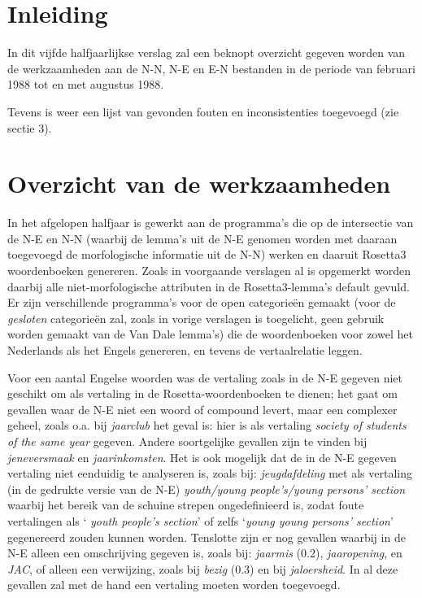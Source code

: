 

   \RosSupersedes{-}
   \MakeRosTitle
%
%

\section{Inleiding}

In dit vijfde halfjaarlijkse verslag zal een beknopt 
overzicht gegeven worden van de 
werkzaamheden aan de N-N, N-E en E-N bestanden in de periode van februari 1988
tot en met augustus 1988.

Tevens is weer een lijst van gevonden fouten en inconsistenties toegevoegd
(zie sectie 3).

\section{Overzicht van de werkzaamheden}

In het afgelopen halfjaar is gewerkt aan de programma's die op
de intersectie van de N-E en N-N (waarbij de lemma's uit de N-E genomen
worden met daaraan toegevoegd de morfologische informatie uit de N-N) 
werken en daaruit Rosetta3 woordenboeken genereren. 
Zoals in voorgaande verslagen al is opgemerkt worden
daarbij alle niet-morfologische attributen in de Rosetta3-lemma's 
default gevuld. Er zijn verschillende programma's voor de open categorie\"{e}n 
gemaakt (voor de {\em gesloten} categorie\"{e}n zal, zoals in vorige verslagen 
is toegelicht, geen gebruik worden gemaakt van de Van Dale lemma's) die
de woordenboeken voor zowel het Nederlands als het Engels genereren, en
tevens de vertaalrelatie leggen. 

Voor een aantal Engelse woorden was de vertaling zoals in de N-E gegeven niet
geschikt om als vertaling in de Rosetta-woordenboeken te dienen; het gaat
om gevallen waar de N-E niet een woord of compound levert, maar een complexer
geheel, zoals o.a. bij {\em jaarclub} het geval is: hier is als vertaling
{\em society of students of the same year} gegeven. Andere soortgelijke 
gevallen 
zijn te vinden bij {\em jeneversmaak} en {\em jaarinkomsten}.
Het is ook mogelijk dat de in de N-E gegeven vertaling niet eenduidig 
te analyseren
is, zoals bij: {\em jeugdafdeling} met als vertaling (in de gedrukte versie van 
de N-E) {\em youth/young people's/young persons' section} waarbij het bereik
van de schuine strepen ongedefinieerd is, zodat foute vertalingen als `{\em
youth people's section}' of zelfs `{\em young young persons' section}' 
gegenereerd zouden kunnen worden.
Tenslotte zijn er nog gevallen waarbij in de N-E alleen een omschrijving 
gegeven is, zoals bij: {\em jaarmis} (0.2), {\em jaaropening}, en {\em JAC}, of 
alleen een verwijzing, zoals bij {\em bezig} (0.3) en bij {\em jaloersheid}.
In al deze gevallen zal met de hand een vertaling moeten worden toegevoegd.

